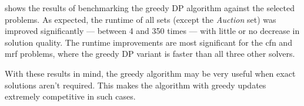 shows the results of benchmarking the greedy DP algorithm against the selected problems.
As expected, the runtime of all sets (except the \emph{Auction} set) was improved significantly --- between \num{4} and \num{350} times --- with little or no decrease in solution quality.
The runtime improvements are most significant for the \gls{cfn} and \gls{mrf} problems, where the greedy DP variant is faster than all three other solvers.



With these results in mind, the greedy algorithm may be very useful when exact solutions aren't required.
This makes the algorithm with greedy updates extremely competitive in such cases.




